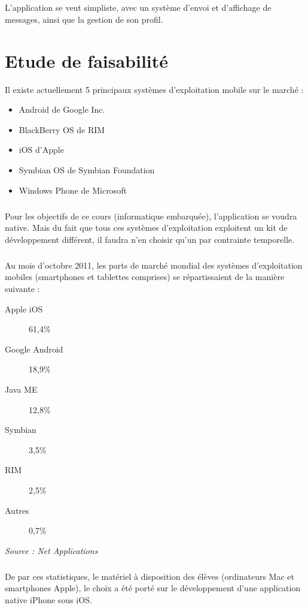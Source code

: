 \documentclass[a4paper,12pt]{report}
\begin{document}
\begin{onehalfspace}
	\paragraph*{}
	L'application se veut simpliste, avec un système d'envoi et d'affichage de messages, ainsi que la gestion de son profil.
	
	\chapter*{Etude de faisabilité}
	Il existe actuellement 5 principaux systèmes d'exploitation mobile sur le marché :
	\begin{itemize}
		\item Android de Google Inc.
		\item BlackBerry OS de RIM
		\item iOS d'Apple
		\item Symbian OS de Symbian Foundation
		\item Windows Phone de Microsoft
	\end{itemize}
	
	\paragraph*{}
	Pour les objectifs de ce cours (informatique embarquée), l'application se voudra native. Mais du fait que tous ces systèmes d'exploitation exploitent un kit de développement différent, il faudra n'en choisir qu'un par contrainte temporelle.
	
	\paragraph*{}
	Au mois d'octobre 2011, les parts de marché mondial des systèmes d'exploitation mobiles (smartphones et tablettes comprises) se répartissaient de la manière suivante :
	\begin{description}
		\item[Apple iOS] 61,4\%
		\item[Google Android] 18,9\%
		\item[Java ME] 12,8\%
		\item[Symbian] 3,5\%
		\item[RIM] 2,5\%
		\item[Autres] 0,7\%
	\end{description}
	\emph{Source : Net Applications}
	
	\paragraph*{}
	De par ces statistiques, le matériel à disposition des élèves (ordinateurs Mac et smartphones Apple), le choix a été porté sur le développement d'une application native iPhone sous iOS.
	

\end{onehalfspace}
\end{document}
